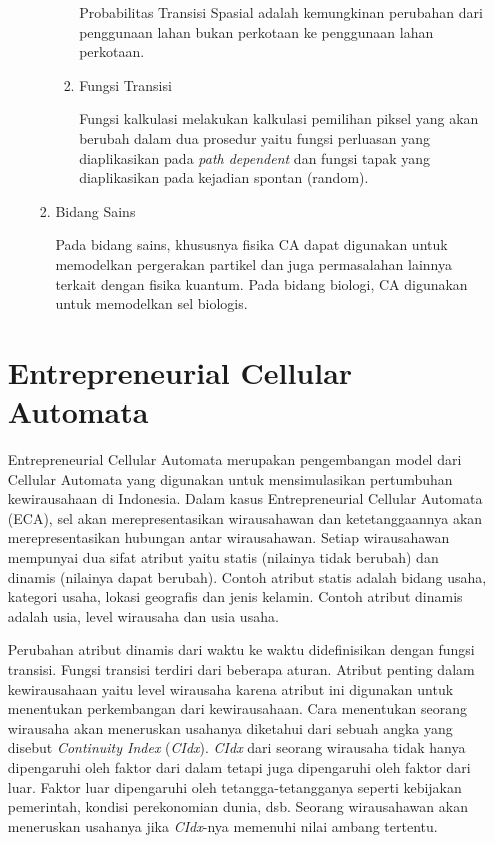 \begin{enumerate}
\begin{enumerate}
\begin{enumerate}
\begin{enumerate}
				Probabilitas Transisi Spasial adalah kemungkinan perubahan dari penggunaan lahan bukan perkotaan ke penggunaan lahan perkotaan.
				\item Fungsi Transisi
				
				Fungsi kalkulasi melakukan kalkulasi pemilihan piksel yang akan berubah dalam dua prosedur yaitu fungsi perluasan yang diaplikasikan pada \textit{path dependent} dan fungsi tapak yang diaplikasikan pada kejadian spontan (random). \cite{referensiCA4}
			\end{enumerate}
			
			\item Bidang Sains
			
			Pada bidang sains, khususnya fisika CA dapat digunakan untuk memodelkan pergerakan partikel dan juga permasalahan lainnya terkait dengan fisika kuantum. Pada bidang biologi, CA digunakan untuk memodelkan sel biologis.
		\end{enumerate}
		
\end{enumerate}

\section{Entrepreneurial Cellular Automata}
\label{sec:ECA}
Entrepreneurial Cellular Automata merupakan pengembangan model dari Cellular Automata yang digunakan untuk mensimulasikan pertumbuhan kewirausahaan di Indonesia. Dalam kasus Entrepreneurial Cellular Automata (ECA), sel akan merepresentasikan wirausahawan dan ketetanggaannya akan merepresentasikan hubungan antar wirausahawan. Setiap wirausahawan mempunyai dua sifat atribut yaitu statis (nilainya tidak berubah) dan dinamis (nilainya dapat berubah). Contoh atribut statis adalah bidang usaha, kategori usaha, lokasi geografis dan jenis kelamin. Contoh atribut dinamis adalah usia, level wirausaha dan usia usaha.  

Perubahan atribut dinamis dari waktu ke waktu didefinisikan dengan fungsi transisi. Fungsi transisi terdiri dari beberapa aturan. Atribut penting dalam kewirausahaan yaitu level wirausaha karena atribut ini digunakan untuk menentukan perkembangan dari kewirausahaan. Cara menentukan seorang wirausaha akan meneruskan usahanya diketahui dari sebuah angka yang disebut \textit{Continuity Index} (\textit{CIdx}). \textit{CIdx} dari seorang wirausaha tidak hanya dipengaruhi oleh faktor dari dalam tetapi juga dipengaruhi oleh faktor dari luar. Faktor luar dipengaruhi oleh tetangga-tetangganya seperti kebijakan pemerintah, kondisi perekonomian dunia, dsb. Seorang wirausahawan akan meneruskan usahanya jika \textit{CIdx}-nya memenuhi nilai ambang tertentu.


\end{enumerate}
